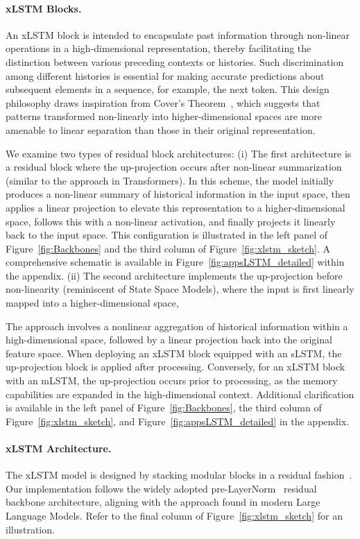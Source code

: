 \paragraph{xLSTM Blocks.}
\label{sec:xLSTMblock}
An xLSTM block is intended to encapsulate past information through non-linear operations in a high-dimensional representation, thereby facilitating the distinction between various preceding contexts or histories. Such discrimination among different histories is essential for making accurate predictions about subsequent elements in a sequence, for example, the next token. This design philosophy draws inspiration from Cover’s Theorem~\citep{Cover:65}, which suggests that patterns transformed non-linearly into higher-dimensional spaces are more amenable to linear separation than those in their original representation. 

We examine two types of residual block architectures: (i) The first architecture is a residual block where the up-projection occurs after non-linear summarization (similar to the approach in Transformers). In this scheme, the model initially produces a non-linear summary of historical information in the input space, then applies a linear projection to elevate this representation to a higher-dimensional space, follows this with a non-linear activation, and finally projects it linearly back to the input space. This configuration is illustrated in the left panel of Figure~\ref{fig:Backbones} and the third column of Figure~\ref{fig:xlstm_sketch}. A comprehensive schematic is available in Figure~\ref{fig:appsLSTM_detailed} within the appendix. (ii) The second architecture implements the up-projection before non-linearity (reminiscent of State Space Models), where the input is first linearly mapped into a higher-dimensional space,

The approach involves a nonlinear aggregation of historical information within a high-dimensional space, followed by a linear projection back into the original feature space. When deploying an xLSTM block equipped with an sLSTM, the up-projection block is applied after processing. Conversely, for an xLSTM block with an mLSTM, the up-projection occurs prior to processing, as the memory capabilities are expanded in the high-dimensional context. Additional clarification is available in the left panel of Figure~\ref{fig:Backbones}, the third column of Figure~\ref{fig:xlstm_sketch}, and Figure~\ref{fig:appsLSTM_detailed} in the appendix.

\paragraph{xLSTM Architecture. }
\label{sec:xLSTMarchitecure}
The xLSTM model is designed by stacking modular blocks in a residual fashion~\citep{Srivastava:15,He:16}. Our implementation follows the widely adopted pre-LayerNorm~\citep{Ba:16b} residual backbone architecture, aligning with the approach found in modern Large Language Models. Refer to the final column of Figure~\ref{fig:xlstm_sketch} for an illustration.


